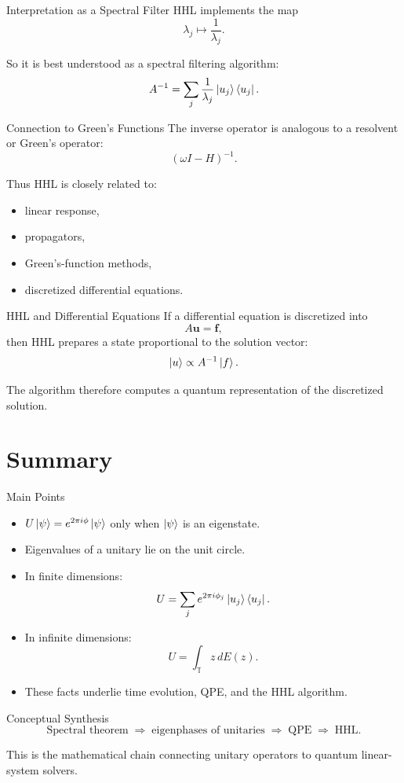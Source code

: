 \documentclass{beamer}
\begin{document}
\begin{frame}{Interpretation as a Spectral Filter}
HHL implements the map
\[
\lambda_j \longmapsto \frac{1}{\lambda_j}.
\]

So it is best understood as a spectral filtering algorithm:
\[
A^{-1}=\sum_j \frac{1}{\lambda_j}\ket{u_j}\bra{u_j}.
\]
\end{frame}

\begin{frame}{Connection to Green's Functions}
The inverse operator is analogous to a resolvent or Green's operator:
\[
(\omega I-H)^{-1}.
\]

Thus HHL is closely related to:
\begin{itemize}
\item linear response,
\item propagators,
\item Green's-function methods,
\item discretized differential equations.
\end{itemize}
\end{frame}

\begin{frame}{HHL and Differential Equations}
If a differential equation is discretized into
\[
A\bm{u}=\bm{f},
\]
then HHL prepares a state proportional to the solution vector:
\[
\ket{u}\propto A^{-1}\ket{f}.
\]

The algorithm therefore computes a quantum representation of the discretized solution.
\end{frame}

\section{Summary}

\begin{frame}{Main Points}
\begin{itemize}
\item \(U\ket{\psi}=e^{2\pi i\phi}\ket{\psi}\) only when \(\ket{\psi}\) is an eigenstate.
\item Eigenvalues of a unitary lie on the unit circle.
\item In finite dimensions:
\[
U=\sum_j e^{2\pi i\phi_j}\ket{u_j}\bra{u_j}.
\]
\item In infinite dimensions:
\[
U=\int_{\mathbb{T}} z\, dE(z).
\]
\item These facts underlie time evolution, QPE, and the HHL algorithm.
\end{itemize}
\end{frame}

\begin{frame}{Conceptual Synthesis}
\[
\boxed{
\text{Spectral theorem} \;\Longrightarrow\;
\text{eigenphases of unitaries} \;\Longrightarrow\;
\text{QPE} \;\Longrightarrow\; \text{HHL}.
}
\]

This is the mathematical chain connecting unitary operators to quantum linear-system solvers.
\end{frame}
\end{document}
